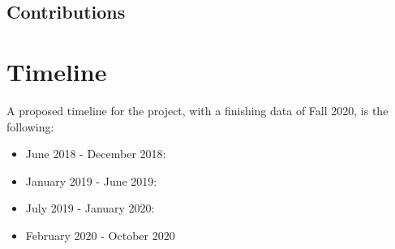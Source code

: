 \documentclass[11pt]{article}
\begin{document}
\subsection{Contributions}

\section{Timeline}
A proposed timeline for the project, with a finishing data of Fall 2020, is the following:
\begin{itemize}
  \item June 2018 - December 2018:
  \item January 2019 - June 2019:
  \item July 2019 - January 2020:
  \item February 2020 - October 2020
\end{itemize}


%

\end{document}
